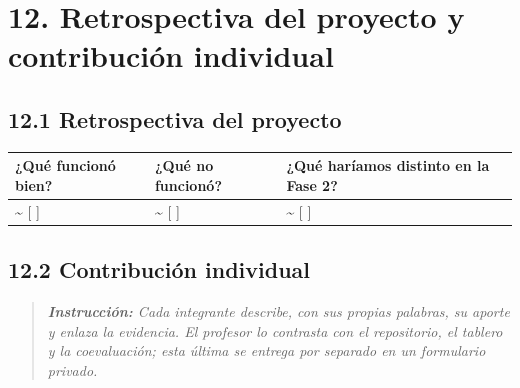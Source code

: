\section{12. Retrospectiva del proyecto y contribución
individual}\label{retrospectiva-del-proyecto-y-contribuciuxf3n-individual}

\subsection{12.1 Retrospectiva del
proyecto}\label{retrospectiva-del-proyecto}

{\def\LTcaptype{none} %
\begin{longtable}[]{@{}
  >{\raggedright\arraybackslash}p{}
  >{\raggedright\arraybackslash}p{}
  >{\raggedright\arraybackslash}p{}@{}}
\toprule\noalign{}
\begin{minipage}[b]{\linewidth}\raggedright
\textbf{¿Qué funcionó bien?}
\end{minipage} & \begin{minipage}[b]{\linewidth}\raggedright
\textbf{¿Qué no funcionó?}
\end{minipage} & \begin{minipage}[b]{\linewidth}\raggedright
\textbf{¿Qué haríamos distinto en la Fase 2?}
\end{minipage} \\
\midrule\noalign{}
\endhead
\bottomrule\noalign{}
\endlastfoot
\textasciitilde{} {[} {]} & \textasciitilde{} {[} {]} &
\textasciitilde{} {[} {]} \\
\end{longtable}
}

\subsection{12.2 Contribución
individual}\label{contribuciuxf3n-individual}

\begin{quote}
\emph{\textbf{Instrucción:} Cada integrante describe, con sus propias
palabras, su aporte y enlaza la evidencia. El profesor lo contrasta con
el repositorio, el tablero y la coevaluación; esta última se entrega por
separado en un formulario privado.}
\end{quote}

